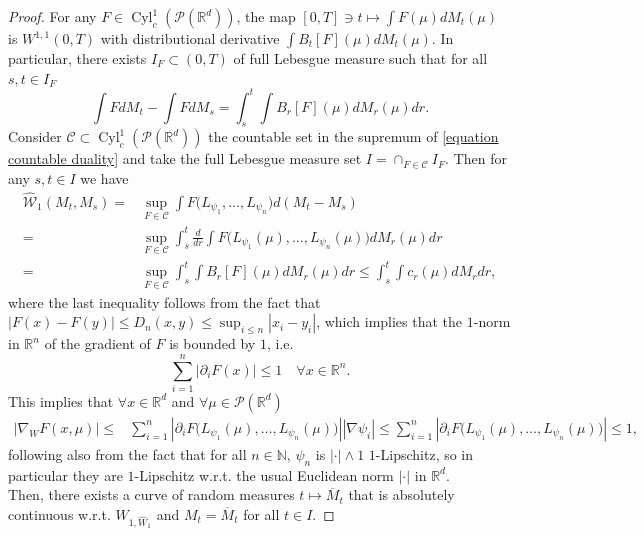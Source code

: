 \documentclass[10pt,leqno]{amsart}
\numberwithin{equation}{section}
\newcommand{\R}{\mathbb{R}}
\newcommand{\N}{\mathbb{N}}
\newcommand{\PP}{\mathcal{P}}
\begin{document}
\begin{proof}
    For any $F\in \operatorname{Cyl}_c^1(\PP(\R^d))$, the map $[0,T]\ni t \mapsto \int F(\mu) dM_t(\mu)$ is $W^{1,1}(0,T)$ with distributional derivative $\int B_t[F](\mu) dM_t(\mu)$. In particular, there exists $I_{F}\subset (0,T)$ of full Lebesgue measure such that for all $s,t \in I_F$
    \[\int FdM_t - \int FdM_s =  \int_s^t \int B_r[F](\mu) dM_r(\mu) dr.\]
    Consider $\mathcal{C}\subset \operatorname{Cyl}_c^1(\PP(\R^d))$ the countable set in the supremum of \eqref{equation countable duality} and take the full Lebesgue measure set $I= \cap_{F\in \mathcal{C}} I_F$. Then for any $s,t \in I$ we have 
    \begin{align*}
        \hat{\mathcal{W}}_1(M_t,M_s) 
        = &
        \sup_{F \in \mathcal{C}} \int F\big(L_{\psi_1},\dots,L_{\psi_n}\big) d(M_t-M_s)
        \\
        = &
        \sup_{F \in \mathcal{C}} \int_{s}^t \frac{d}{dr}\int F\big(L_{\psi_1}(\mu),\dots,L_{\psi_n}(\mu)\big) dM_r(\mu) dr 
        \\
        = & \sup_{F \in \mathcal{C}} \int_s^t \int B_r[F](\mu) dM_r(\mu) dr 
        \leq  \int_s^t \int c_r(\mu)dM_r dr,
    \end{align*}
    where the last inequality follows from the fact that $|F(x)-F(y)|\leq D_n(x,y)\leq \sup_{i\leq n}|x_i-y_i|$, which implies that the $1$-norm in $\R^n$ of the gradient of $F$ is bounded by $1$, i.e.
    \[\sum_{i=1}^n|\partial_i F(x)|\leq 1 \quad \forall x\in \R^n. \]
    This implies that $\forall x\in \R^d$ and $\forall \mu\in \PP(\R^d)$
    \begin{align*}
        |\nabla_W F(x,\mu)| \leq & \sum_{i=1}^n |\partial_i F\big(L_{\psi_1}(\mu),\dots,L_{\psi_n}(\mu)\big)| |\nabla \psi_i|
        \leq 
        \sum_{i=1}^n |\partial_i F\big(L_{\psi_1}(\mu),\dots,L_{\psi_n}(\mu)\big)| \leq 1,
    \end{align*}
    following also from the fact that for all $n\in \N$, $\psi_n$ is $|\cdot|\wedge 1$ $1$-Lipschitz, so in particular they are $1$-Lipschitz w.r.t. the usual Euclidean norm $|\cdot|$ in $\R^d$.
    \\
    Then, there exists a curve of random measures $t \mapsto \overline{M}_t$ that is absolutely continuous w.r.t. $W_{1,\hat{W}_1}$ and $M_t = \overline{M}_t$ for all $t\in I$.
\end{proof}
\end{document}
